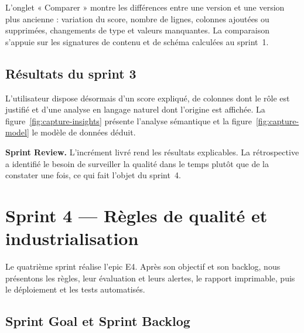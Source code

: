 L'onglet « Comparer » montre les différences entre une version et une version plus ancienne : variation du score, nombre de lignes, colonnes ajoutées ou supprimées, changements de type et valeurs manquantes. La comparaison s'appuie sur les signatures de contenu et de schéma calculées au sprint~1.

\subsection{Résultats du sprint 3}

L'utilisateur dispose désormais d'un score expliqué, de colonnes dont le rôle est justifié et d'une analyse en langage naturel dont l'origine est affichée. La figure~\ref{fig:capture-insights} présente l'analyse sémantique et la figure~\ref{fig:capture-model} le modèle de données déduit.



\noindent\textbf{Sprint Review.} L'incrément livré rend les résultats explicables. La rétrospective a identifié le besoin de surveiller la qualité dans le temps plutôt que de la constater une fois, ce qui fait l'objet du sprint~4.

\section{Sprint 4 — Règles de qualité et industrialisation}

Le quatrième sprint réalise l'epic E4. Après son objectif et son backlog, nous présentons les règles, leur évaluation et leurs alertes, le rapport imprimable, puis le déploiement et les tests automatisés.

\subsection{Sprint Goal et Sprint Backlog}


